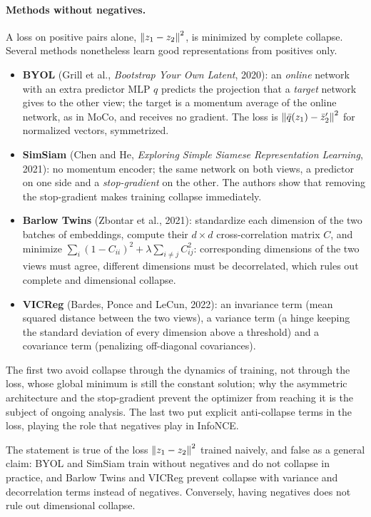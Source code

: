 \begin{notechapter}
\paragraph{Methods without negatives.} A loss on positive pairs alone, $\left\|z_1 - z_2\right\|^2$, is minimized by complete
collapse. Several methods nonetheless learn good representations from positives only.
\begin{itemize}
  \item \textbf{BYOL} (Grill et al., \emph{Bootstrap Your Own Latent}, 2020): an \emph{online} network with an extra
        predictor MLP $q$ predicts the projection that a \emph{target} network gives to the other view; the
        target is a momentum average of the online network, as in MoCo, and receives no gradient.
        The loss is $\left\|\bar q(z_1) - \bar z'_2\right\|^2$ for normalized vectors, symmetrized.
  \item \textbf{SimSiam} (Chen and He, \emph{Exploring Simple Siamese Representation Learning}, 2021):
        no momentum encoder; the same network on both views, a predictor on one side and a
        \emph{stop-gradient} on the other. The authors show that removing the stop-gradient makes
        training collapse immediately.
  \item \textbf{Barlow Twins} (Zbontar et al., 2021): standardize each dimension of the two batches of
        embeddings, compute their $d\times d$ cross-correlation matrix $C$, and minimize
        $\sum_i(1 - C_{ii})^2 + \lambda\sum_{i\neq j}C_{ij}^2$: corresponding dimensions of the two views must agree, different
        dimensions must be decorrelated, which rules out complete and dimensional collapse.
  \item \textbf{VICReg} (Bardes, Ponce and LeCun, 2022): an invariance term (mean squared distance
        between the two views), a variance term (a hinge keeping the standard deviation of every
        dimension above a threshold) and a covariance term (penalizing off-diagonal
        covariances).
\end{itemize}
The first two avoid collapse through the dynamics of training, not through the loss, whose
global minimum is still the constant solution; why the asymmetric architecture and the
stop-gradient prevent the optimizer from reaching it is the subject of ongoing analysis. The last
two put explicit anti-collapse terms in the loss, playing the role that negatives play in
InfoNCE.

\begin{pitfall}
The statement is true of the loss $\left\|z_1 - z_2\right\|^2$ trained naively, and false as a general claim: BYOL and
SimSiam train without negatives and do not collapse in practice, and Barlow Twins and VICReg
prevent collapse with variance and decorrelation terms instead of negatives. Conversely,
having negatives does not rule out dimensional collapse.
\end{pitfall}


\end{notechapter}
